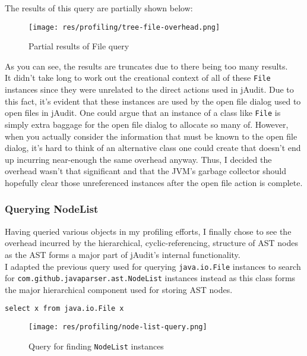 \documentclass[9pt]{article}
\renewenvironment{framed}[1][\hsize]
   {\MakeFramed{\hsize#1\advance\hsize-\width \FrameRestore}}%
   {\endMakeFramed}
\begin{document}
			The results of this query are partially shown below:\\

			\begin{figure}[H]
				\centering
				\texttt{[image: res/profiling/tree-file-overhead.png]}
				\caption{Partial results of File query}
			\end{figure}

			As you can see, the results are truncates due to there being too
			many results.\\
			
			It didn't take long to work out the creational context of all of
			these \texttt{File} instances since they were unrelated to the
			direct actions used in jAudit. Due to this fact, it's evident that
			these instances are used by the open file dialog used to open files
			in jAudit. One could argue that an instance of a class like
			\texttt{File} is simply extra baggage for the open file dialog to
			allocate so many of. However, when you actually consider the
			information that must be known to the open file dialog, it's hard to
			think of an alternative class one could create that doesn't end up
			incurring near-enough the same overhead anyway. Thus, I decided the
			overhead wasn't that significant and that the JVM's garbage
			collector should hopefully clear those unreferenced instances after
			the open file action is complete.\\


		\subsubsection{Querying NodeList}
			
			Having queried various objects in my profiling efforts, I finally
			chose to see the overhead incurred by the hierarchical,
			cyclic-referencing, structure of AST nodes as the AST forms a major
			part of jAudit's internal functionality.\\

			I adapted the previous query used for querying \texttt{java.io.File}
			instances to search for \texttt{com.github.javaparser.ast.NodeList}
			instances instead as this class forms the major hierarchical
			component used for storing AST nodes.\\

			\begin{framed}
				\begin{lstlisting}
select x from java.io.File x
				\end{lstlisting}
			\end{framed}
			\begin{figure}[H]
				\centering
				\texttt{[image: res/profiling/node-list-query.png]}
				\caption{Query for finding \texttt{NodeList} instances}
			\end{figure}
\end{document}
